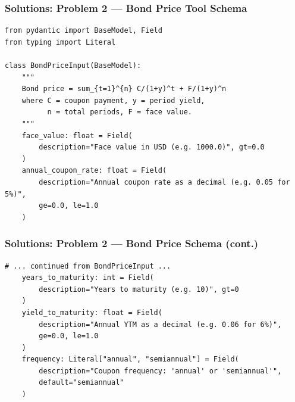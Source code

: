 \documentclass[9pt,t]{beamer}
\begin{document}
\begin{frame}[fragile]
\frametitle{Solutions: Problem 2 --- Bond Price Tool Schema}

\begin{lstlisting}[basicstyle=\ttfamily\scriptsize]
from pydantic import BaseModel, Field
from typing import Literal

class BondPriceInput(BaseModel):
    """
    Bond price = sum_{t=1}^{n} C/(1+y)^t + F/(1+y)^n
    where C = coupon payment, y = period yield,
          n = total periods, F = face value.
    """
    face_value: float = Field(
        description="Face value in USD (e.g. 1000.0)", gt=0.0
    )
    annual_coupon_rate: float = Field(
        description="Annual coupon rate as a decimal (e.g. 0.05 for 5%)",
        ge=0.0, le=1.0
    )
\end{lstlisting}
\end{frame}

\begin{frame}[fragile]
\frametitle{Solutions: Problem 2 --- Bond Price Schema (cont.)}

\begin{lstlisting}[basicstyle=\ttfamily\scriptsize]
    # ... continued from BondPriceInput ...
    years_to_maturity: int = Field(
        description="Years to maturity (e.g. 10)", gt=0
    )
    yield_to_maturity: float = Field(
        description="Annual YTM as a decimal (e.g. 0.06 for 6%)",
        ge=0.0, le=1.0
    )
    frequency: Literal["annual", "semiannual"] = Field(
        description="Coupon frequency: 'annual' or 'semiannual'",
        default="semiannual"
    )
\end{lstlisting}
\end{frame}
\end{document}

